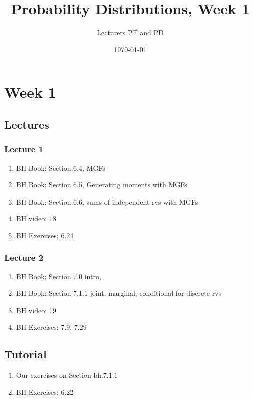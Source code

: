 \documentclass[a4paper,11pt]{book}
\author{Lecturers PT and PD
}
\date{\today}
\title{Probability Distributions, Week 1}
\begin{document}
\maketitle
\tableofcontents

\chapter{Week 1}
\label{cha:week-1}



\section{Lectures}
\label{sec:lectures}

\subsection{Lecture 1}
\label{sec:lecture-1}

\begin{enumerate}
\item BH Book: Section 6.4, MGFs
\item BH Book: Section 6.5, Generating moments with MGFs
\item BH Book: Section 6.6,  sums of independent rvs with MGFs
\item BH video: 18
\item BH Exercises: 6.24
\end{enumerate}


\subsection{Lecture 2}
\label{sec:lecture-1}
\begin{enumerate}
\item BH Book: Section 7.0 intro,
\item BH Book: Section 7.1.1 joint, marginal, conditional for discrete rvs
\item BH video: 19
\item BH Exercises: 7.9, 7.29
\end{enumerate}


\section{Tutorial}
\label{sec:tutorial}

\begin{enumerate}
\item Our exercises on Section bh.7.1.1
\item BH Exercises: 6.22
\end{enumerate}
\end{document}

